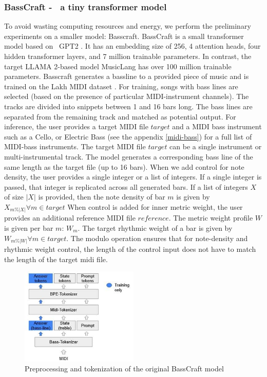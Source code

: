 \subsubsection{BassCraft -  a tiny transformer model}
To avoid wasting computing resources and energy, we perform the preliminary experiments on a smaller model: Basscraft. BassCraft is a small transformer model based on  GPT2 \cite{Radford_Wu_Child_Luan_gpt2_2019}. It has an embedding size of 256, 4 attention heads, four hidden transformer layers, and 7 million trainable parameters. In contrast, the target LLAMA 2-based model MusicLang has over 100 million trainable parameters. Basscraft generates a bassline to a provided piece of music and is trained on the Lakh MIDI dataset \cite{Raffel_2016}. For training, songs with bass lines are selected (based on the presence of particular MIDI-instrument channels). The tracks are divided into snippets between 1 and 16 bars long. The bass lines are separated from the remaining track and matched as potential output. 
For inference, the user provides a target MIDI file $target$ and a MIDI bass instrument such as a Cello, or Electric Bass (see the appendix \ref{midi-bass}) for a full list of MIDI-bass instruments. The target MIDI file $target$ can be a single instrument or multi-instrumental track. The model generates a corresponding bass line of the same length as the target file (up to 16 bars). When we add control for note density, the user provides a single integer or a list of integers. If a single integer is passed, that integer is replicated across all generated bars. If a list of integers $X$ of size $|X|$ is provided, then the note density of bar $m$ is given by $X_{m\%|X|} \forall m \in target$
When control is added for inner metric weight, the user provides an additional reference MIDI file $reference$. The metric weight profile $W$ is given per bar $m$: $W_{m}$. The target rhythmic weight of a bar is given by $W_{m\%|W|} \forall m \in target$. The modulo operation ensures that for note-density and rhythmic weight control, the length of the control input does not have to match the length of the target midi file.    

\begin{figure}[H]
\centering
\includegraphics[width=0.5\textwidth]{IMAGES/Preprocessing1.jpg} 
\caption{Preprocessing and tokenization of the original BassCraft model}
\label{fig:preprocessing1}
\end{figure}

